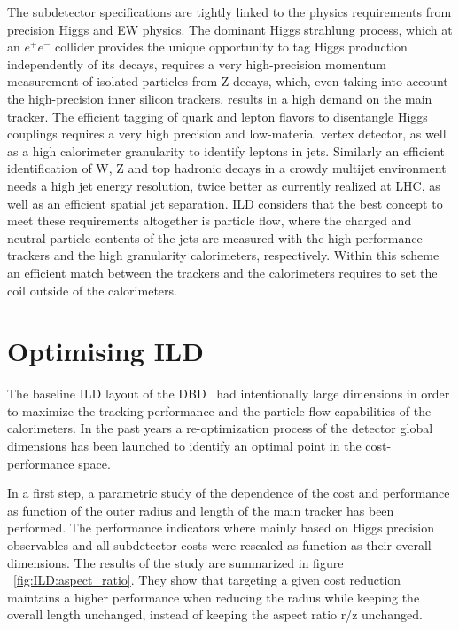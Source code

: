The subdetector specifications are tightly linked to the physics requirements from precision Higgs and EW physics. The dominant Higgs strahlung process, which at an $e^+e^-$ collider provides the unique opportunity to tag Higgs production independently of its decays, requires a very high-precision momentum measurement of isolated particles from Z decays, which, even taking into account the high-precision inner silicon trackers, results in a high demand on the main tracker. The efficient tagging of quark and lepton flavors to disentangle Higgs couplings requires a very high precision and low-material vertex detector, as well as a high calorimeter granularity to identify leptons in jets. Similarly an efficient identification of W, Z and top hadronic decays in a crowdy multijet environment needs a high jet energy resolution, twice better as currently realized at LHC, as well as an efficient spatial jet separation. ILD considers that the best concept to meet these requirements altogether is particle flow, where the charged and neutral particle contents of the jets are measured with the high performance trackers and the high granularity calorimeters, respectively. Within this scheme an efficient match between the trackers and the calorimeters requires to set the coil outside of the calorimeters.     



\section{Optimising ILD}

The baseline ILD layout of the DBD~\cite{ild:bib:ILDDBD} had intentionally large dimensions in order to maximize the tracking performance and the particle flow capabilities of the calorimeters. In the past years a re-optimization process of the detector global dimensions has been launched to identify an optimal point in the cost-performance space.

In a first step, a parametric study of the dependence of the cost and performance as function of the outer radius and length of the main tracker has been performed. The performance indicators where mainly based on Higgs precision observables and all subdetector costs were rescaled as function as their overall dimensions. The results of the study are summarized in figure ~\ref{fig:ILD:aspect_ratio}. They show that targeting a given cost reduction maintains a higher performance when reducing the radius while keeping the overall length unchanged, instead of keeping the aspect ratio r/z unchanged.  


